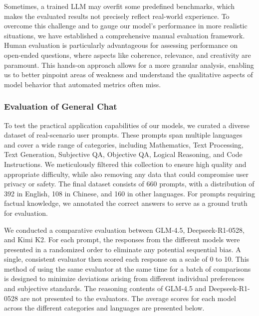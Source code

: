 Sometimes, a trained LLM may overfit some predefined benchmarks, which makes the evaluated results not precisely reflect real-world experience.
To overcome this challenge and to gauge our model's performance in more realistic situations, we have established a comprehensive manual evaluation framework. Human evaluation is particularly advantageous for assessing performance on open-ended questions, where aspects like coherence, relevance, and creativity are paramount. This hands-on approach allows for a more granular analysis, enabling us to better pinpoint areas of weakness and understand the qualitative aspects of model behavior that automated metrics often miss.

\subsubsection{Evaluation of General Chat}
To test the practical application capabilities of our models, we curated a diverse dataset of real-scenario user prompts. These prompts span multiple languages and cover a wide range of categories, including Mathematics, Text Processing, Text Generation, Subjective QA, Objective QA, Logical Reasoning, and Code Instructions. We meticulously filtered this collection to ensure high quality and appropriate difficulty, while also removing any data that could compromise user privacy or safety. The final dataset consists of 660 prompts, with a distribution of 392 in English, 108 in Chinese, and 160 in other languages. For prompts requiring factual knowledge, we annotated the correct answers to serve as a ground truth for evaluation.

We conducted a comparative evaluation between GLM-4.5, Deepseek-R1-0528, and Kimi K2. For each prompt, the responses from the different models were presented in a randomized order to eliminate any potential sequential bias. A single, consistent evaluator then scored each response on a scale of 0 to 10. This method of using the same evaluator at the same time for a batch of comparisons is designed to minimize deviations arising from different individual preferences and subjective standards. The reasoning contents of GLM-4.5 and Deepseek-R1-0528 are not presented to the evaluators.
The average scores for each model across the different categories and languages are presented below.

